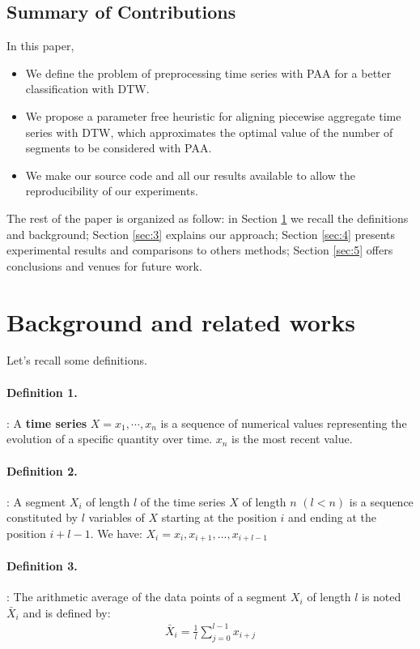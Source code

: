 \subsection{Summary of Contributions}

In this paper, 
\begin{itemize}
\item We define the problem of preprocessing time series with PAA for a better classification with
DTW.
\item We propose a parameter free heuristic for aligning piecewise aggregate time series with DTW, which approximates the optimal value of the number of segments to be considered with PAA. 
\item  We make our source code and all our results available to allow the reproducibility of
our experiments.
\end{itemize}

The rest of the paper is organized as follow: in Section
\ref{sec:1} we recall the definitions and background; Section \ref{sec:3} explains our approach;
Section \ref{sec:4} presents experimental results and comparisons to others methods; Section
\ref{sec:5} offers conclusions and venues for future work.   




\section{Background and related works}
\label{sec:1}
Let's recall some definitions.


\paragraph{Definition 1.}:  A \textbf{time series}
$X=x_{1},\cdots,x_{n}$ is a sequence of numerical values representing the evolution of a specific quantity over time. $x_{n}$ is the most recent value.


\paragraph{Definition 2.}:
A segment  $X_{i}$ of length  $l$ of the time series $X$ of length $n$
$(l<n)$ is a sequence constituted by $l$  variables of $X$ starting at the position $i$ and ending at the position $i+l-1$.
We have: $X_{i}=x_{i},x_{i+1},...,x_{i+l-1}$


\paragraph{Definition 3.}:
The arithmetic average of the data points of a segment  $X_{i}$ of length
$l$ is noted $\bar{X}_{i}$ and is defined by:
\begin{eqnarray}
\bar{X}_{i}=\frac{1}{l}\sum_{j=0}^{l-1}x_{i+j}
\end{eqnarray}



